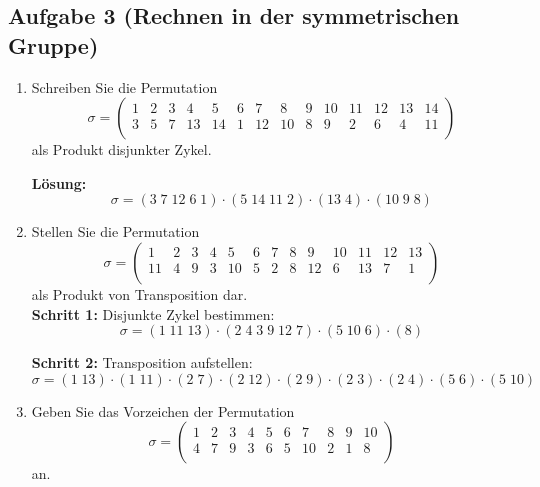\documentclass[11pt,a4paper,ngerman]{article}
\begin{document}
\subsection*{Aufgabe 3 \mdseries (Rechnen in der symmetrischen Gruppe)}

\begin{enumerate}[\bfseries a)]
\item Schreiben Sie die Permutation
$$ \sigma =
\left( \begin{array}{cccccccccccccc}
1 & 2 & 3 & 4 & 5 & 6 & 7 & 8 & 9 & 10 & 11 & 12 & 13 & 14  \\
3 & 5 & 7 & 13 & 14 & 1 & 12 & 10 & 8 & 9 & 2 & 6 & 4 & 11  \\
\end{array} \right)
$$
als Produkt disjunkter Zykel.

\textbf{Lösung:}\\
$$
\sigma = (3 \; 7 \; 12 \; 6  \;1) \cdot (5 \;14 \;11\; 2) \cdot (13 \;4) \cdot (10\; 9\; 8)
$$


\item Stellen Sie die Permutation
$$ \sigma = 
\left( \begin{array}{cccccccccccccc}
1 & 2 & 3 & 4 & 5 & 6 & 7 & 8 & 9 & 10 & 11 & 12 & 13  \\
11 & 4 & 9 & 3 & 10 & 5 & 2 & 8 & 12 & 6 & 13 & 7 & 1  \\
\end{array} \right)
$$
als Produkt von Transposition dar.\\

\textbf{Schritt 1:} Disjunkte Zykel bestimmen:\\
$$
\sigma = \left( 1  \; 11 \; 13 \right) \cdot \left( 2 \; 4 \; 3 \; 9 \; 12 \; 7  \right) \cdot \left( 5 \; 10 \; 6 \right) \cdot \left( 8 \right)
$$

\textbf{Schritt 2:} Transposition aufstellen:\\
$$
\sigma = \left( 1 \; 13 \right) \cdot \left( 1 \; 11 \right) \cdot \left( 2 \; 7 \right) \cdot \left( 2 \;  12 \right) \cdot \left( 2 \; 9 \right) \cdot \left( 2 \; 3 \right) \cdot \left( 2 \; 4 \right) \cdot \left( 5 \; 6 \right) \cdot \left( 5 \; 10 \right)
$$

\pagebreak

\item Geben Sie das Vorzeichen der Permutation 
$$ \sigma =
\left( \begin{array}{cccccccccccccc}
1 & 2 & 3 & 4 & 5 & 6 & 7 & 8 & 9 & 10  \\
4 & 7 & 9 & 3 & 6 & 5 & 10 & 2 & 1 & 8  \\
\end{array} \right)
$$
an.\\


\end{enumerate}
\end{document}
